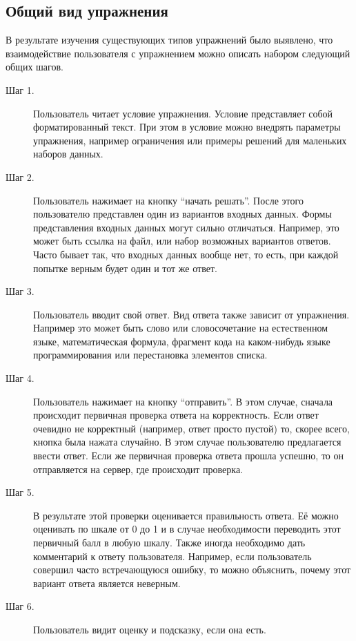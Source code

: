 \documentclass{matmex-diploma-custom}
\begin{document}
\subsection{Общий вид упражнения}
В результате изучения существующих типов упражнений было
выявлено, что взаимодействие пользователя с упражнением можно описать
набором следующий общих шагов.

\begin{description}
\item[Шаг 1.] Пользователь читает условие упражнения. Условие
  представляет собой форматированный текст. При этом в условие можно
  внедрять параметры упражнения, например ограничения или примеры
  решений для маленьких наборов данных.

\item[Шаг 2.] Пользователь нажимает на кнопку ``начать решать''.
  После этого пользователю представлен один из вариантов входных
  данных. Формы представления входных данных могут сильно
  отличаться. Например, это может быть ссылка на файл, или
  набор возможных вариантов ответов. Часто бывает так, что входных
  данных вообще нет, то есть, при каждой попытке верным будет один и тот
  же ответ.
\item[Шаг 3.] Пользователь вводит свой ответ. Вид ответа также
  зависит от упражнения. Например это может быть слово или
  словосочетание на естественном языке, математическая формула, фрагмент
  кода на каком-нибудь языке программирования или перестановка элементов
  списка.
\item[Шаг 4.] Пользователь нажимает на кнопку ``отправить''. В этом
  случае, сначала происходит первичная проверка ответа на
  корректность. Если ответ очевидно не корректный (например, ответ
  просто пустой) то, скорее всего, кнопка была нажата случайно. В этом
  случае пользователю предлагается ввести ответ. Если же первичная
  проверка ответа прошла успешно, то он отправляется на сервер, где
  происходит проверка.
\item[Шаг 5.] В результате этой проверки оценивается правильность
  ответа. Её можно оценивать по шкале от 0 до 1 и в случае
  необходимости переводить этот первичный балл в любую шкалу. Также
  иногда необходимо дать комментарий к ответу пользователя. Например,
  если пользователь совершил часто встречающуюся ошибку, то можно
  объяснить, почему этот вариант ответа является неверным.
\item[Шаг 6.] Пользователь видит оценку и подсказку, если она есть.
\end{description}
\end{document}
